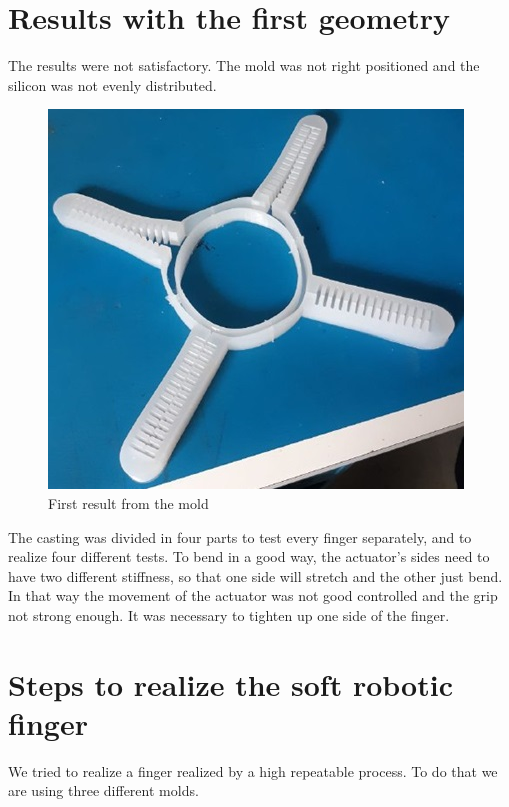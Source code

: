 \documentclass{article}
\begin{document}
\section{Results with the first geometry}

The results were not satisfactory. The mold was not right positioned and the silicon was not evenly distributed. 
\begin{figure}[h]
    \centering
    \includegraphics[scale=0.5]{Pictures/FirstResult.jpg}
    \caption{First result from the mold}
    \label{fig:firstMold}
\end{figure}

The casting was divided in four parts to test every finger separately, and to realize four different tests.
To bend in a good way, the actuator’s sides need to have two different stiffness, so that one side will stretch and the other just bend. In that way the movement of the actuator was not good controlled and the grip not strong enough. It was necessary to tighten up one side of the finger.

\section{Steps to realize the soft robotic finger}
We tried to realize a finger realized by a high repeatable process.
To do that we are using three different molds. 
\end{document}
